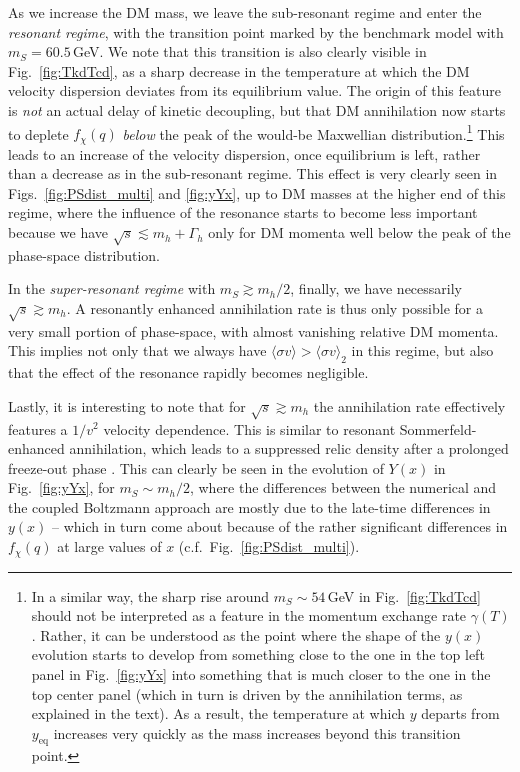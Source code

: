 \documentclass[twocolumn,showpacs,amsmath,amssymb,superscriptaddress,nofootinbib]{revtex4-1}
\begin{document}
As we increase the DM mass, we leave the sub-resonant regime and enter the {\it resonant regime}, 
with the transition point marked by the benchmark model with $m_S=60.5$\,GeV. We note that this 
transition is also clearly visible in Fig.~\ref{fig:TkdTcd}, as a sharp decrease in the temperature
at which the DM velocity dispersion deviates from its equilibrium value.
The origin of this feature is {\it not} an actual delay of kinetic decoupling, but that DM annihilation 
now starts to deplete $f_\chi(q)$ {\it below} the peak of the would-be Maxwellian distribution.\footnote{
In a similar way, the sharp rise around $m_S\sim 54$\,GeV in Fig.~\ref{fig:TkdTcd} 
should not be interpreted as a feature in the momentum exchange rate $\gamma(T)$.
Rather, it can be understood as the point where the shape of the $y(x)$ evolution starts to develop 
from something close to the one in the top left panel in Fig.~\ref{fig:yYx} into something that is 
much closer to the one in the top center panel (which in turn is driven by the annihilation terms, as
explained in the text). As a result, the temperature at which $y$ departs 
from $y_\mathrm{eq}$ increases very quickly as the mass increases beyond this
transition point.
}
This leads to an increase of the velocity dispersion, once equilibrium is left, rather than a decrease as in the 
sub-resonant regime. This effect is very clearly seen in Figs.~\ref{fig:PSdist_multi} and \ref{fig:yYx}, 
up to DM masses at the 
higher end of this regime, where the influence of the resonance starts to become less important
because we have $\sqrt{s}\lesssim m_h+\Gamma_h$ only for DM momenta well below the peak of 
the phase-space distribution. 

In the {\it super-resonant regime} with $m_S\gtrsim m_h/2$, finally, we have necessarily
$\sqrt{s}\gtrsim m_h$. A resonantly enhanced annihilation rate  is thus only possible for a 
very small portion of phase-space, with almost vanishing relative DM momenta. This implies not
only that we always have $\langle \sigma v\rangle> \langle \sigma v\rangle_2$ in this regime, 
but also that the effect of the resonance rapidly becomes negligible.

Lastly, it is interesting to note that for $\sqrt{s}\gtrsim m_h$ the annihilation rate effectively  
features a  $1/v^2$ velocity dependence. This is similar to resonant Sommerfeld-enhanced annihilation, 
which leads to a suppressed relic density after a prolonged freeze-out phase \cite{vandenAarssen:2012ag}.
This can clearly be seen in the evolution of $Y(x)$ in Fig.~\ref{fig:yYx}, for $m_S\sim m_h/2$, 
where the differences between the numerical and
the coupled Boltzmann approach are mostly due to the late-time differences in $y(x)$ -- which in 
turn come about because of the rather significant differences in $f_\chi(q)$ at large values of $x$
(c.f.~Fig.~\ref{fig:PSdist_multi}).
\end{document}
